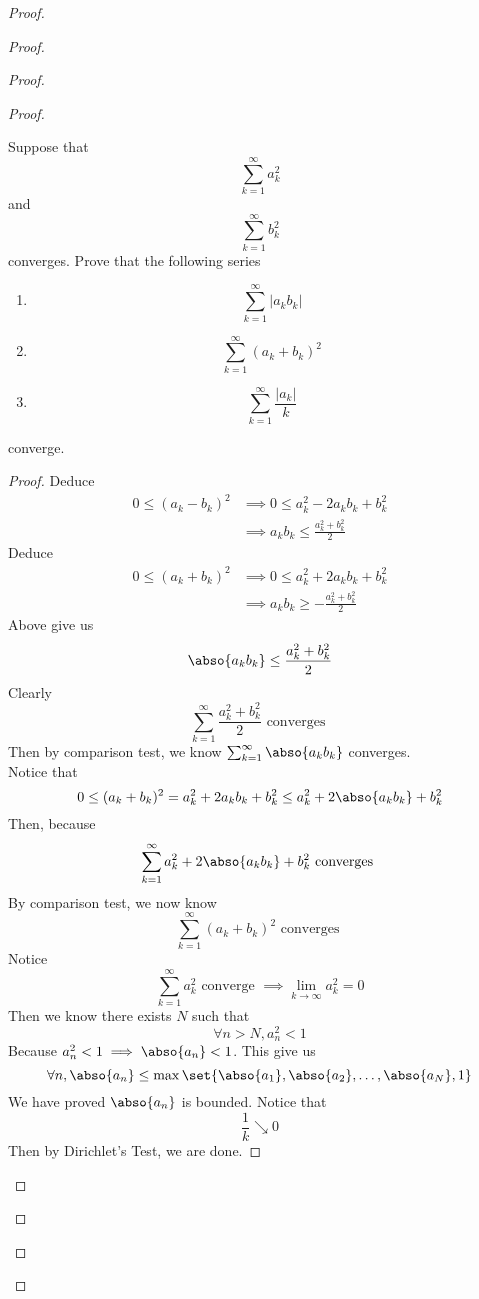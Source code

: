 \documentclass{report}
\begin{document}
\begin{proof}
\begin{proof}
\begin{proof}
\begin{proof}
\begin{question}{}{}
Suppose that 
\[
\sum_{k=1}^{\infty} a_k^2
\]
and 
\[
\sum_{k=1}^{\infty} b_k^2
\]
converges. Prove that the following series
\begin{enumerate}
    \item \[
    \sum_{k=1}^{\infty} |a_kb_k|
    \]
    \item \[
    \sum_{k=1}^{\infty} (a_k + b_k)^2
    \]
    \item \[
    \sum_{k=1}^{\infty} \frac{|a_k|}{k}
    \]
\end{enumerate}
converge.
\end{question}
\begin{proof}
Deduce 
\begin{align*}
  0\leq (a_k-b_k)^{2}&\implies 0\leq a_k^2-2a_kb_k+b_k^2\\
  &\implies a_kb_k\leq \frac{a_k^2+b_k^2}{2}
\end{align*}
Deduce
\begin{align*}
  0\leq (a_k+b_k)^2&\implies 0\leq a_k^2+2a_kb_k+b_k^2\\
&\implies a_kb_k\geq  -\frac{a_k^2+b_k^2}{2}
\end{align*}
Above give us
\begin{equation*}
\abso{a_kb_k}\leq \frac{a_k^2+b_k^2}{2}
\end{equation*}
Clearly
\begin{equation*}
\sum_{k=1}^\infty \frac{a_k^2+b_k^2}{2}\text{ converges }
\end{equation*}
Then by comparison test, we know $\sum_{k=1}^\infty \abso{a_kb_k}$ converges.\\

Notice that
\begin{equation*}
  0\leq (a_k+b_k)^2=a_k^2 +2a_kb_k+b_k^2 \leq a_k^2+2\abso{a_kb_k}+b_k^2 
\end{equation*}
Then, because 
\begin{equation*}
\sum_{k=1}^\infty a_k^2 +2\abso{a_kb_k}+b_k^2\text{ converges }
\end{equation*}
By comparison test, we now know 
\begin{equation*}
\sum_{k=1}^\infty (a_k+b_k)^2 \text{ converges }
\end{equation*}
Notice
\begin{equation*}
\sum_{k=1}^\infty a_k^2\text{ converge }\implies \lim_{k\to\infty}a_k^2=0
\end{equation*}
Then we know there exists $N$ such that
 \begin{equation*}
\forall n>N, a_n^2<1
\end{equation*}
Because $a_n^2<1\implies \abso{a_n}<1$. This give us
\begin{equation*}
\forall n, \abso{a_n}\leq \max \set{\abso{a_1},\abso{a_2},\dots ,\abso{a_N},1}
\end{equation*}
We have proved $\abso{a_n}$ is bounded. Notice that 
\begin{equation*}
\frac{1}{k}\searrow 0
\end{equation*}
Then by Dirichlet's Test, we are done.


\end{proof}
\end{proof}
\end{proof}
\end{proof}
\end{proof}
\end{document}
